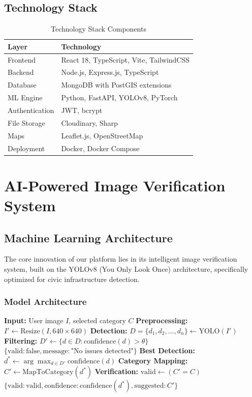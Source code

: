 \documentclass[12pt,a4paper]{article}
\begin{document}
\subsection{Technology Stack}

\begin{table}[h]
\centering
\begin{tabular}{@{}ll@{}}
\toprule
\textbf{Layer} & \textbf{Technology} \\
\midrule
Frontend & React 18, TypeScript, Vite, TailwindCSS \\
Backend & Node.js, Express.js, TypeScript \\
Database & MongoDB with PostGIS extensions \\
ML Engine & Python, FastAPI, YOLOv8, PyTorch \\
Authentication & JWT, bcrypt \\
File Storage & Cloudinary, Sharp \\
Maps & Leaflet.js, OpenStreetMap \\
Deployment & Docker, Docker Compose \\
\bottomrule
\end{tabular}
\caption{Technology Stack Components}
\end{table}

\section{AI-Powered Image Verification System}

\subsection{Machine Learning Architecture}

The core innovation of our platform lies in its intelligent image verification system, built on the YOLOv8 (You Only Look Once) architecture, specifically optimized for civic infrastructure detection.

\subsubsection{Model Architecture}

\begin{algorithm}
\caption{Image Verification Workflow}
\begin{algorithmic}[1]
\STATE \textbf{Input:} User image $I$, selected category $C$
\STATE \textbf{Preprocessing:} $I' \leftarrow \text{Resize}(I, 640 \times 640)$
\STATE \textbf{Detection:} $D = \{d_1, d_2, ..., d_n\} \leftarrow \text{YOLO}(I')$
\STATE \textbf{Filtering:} $D' \leftarrow \{d \in D : \text{confidence}(d) > \theta\}$
    \RETURN $\{\text{valid}: \text{false}, \text{message}: \text{"No issues detected"}\}$
\ENDIF
\STATE \textbf{Best Detection:} $d^* \leftarrow \arg\max_{d \in D'} \text{confidence}(d)$
\STATE \textbf{Category Mapping:} $C' \leftarrow \text{MapToCategory}(d^*)$
\STATE \textbf{Verification:} $\text{valid} \leftarrow (C' = C)$
\RETURN $\{\text{valid}: \text{valid}, \text{confidence}: \text{confidence}(d^*), \text{suggested}: C'\}$
\end{algorithmic}
\end{algorithm}
\end{document}
